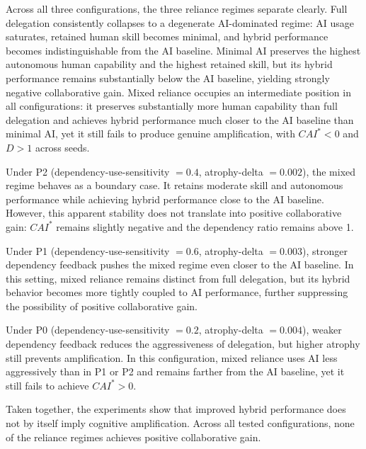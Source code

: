 \documentclass[11pt,a4paper]{article}
\begin{document}
Across all three configurations, the three reliance regimes separate clearly. Full delegation consistently collapses to a degenerate AI-dominated regime: AI usage saturates, retained human skill becomes minimal, and hybrid performance becomes indistinguishable from the AI baseline. Minimal AI preserves the highest autonomous human capability and the highest retained skill, but its hybrid performance remains substantially below the AI baseline, yielding strongly negative collaborative gain. Mixed reliance occupies an intermediate position in all configurations: it preserves substantially more human capability than full delegation and achieves hybrid performance much closer to the AI baseline than minimal AI, yet it still fails to produce genuine amplification, with $CAI^*<0$ and $D>1$ across seeds.

Under P2 (dependency-use-sensitivity $=0.4$, atrophy-delta $=0.002$), the mixed regime behaves as a boundary case. It retains moderate skill and autonomous performance while achieving hybrid performance close to the AI baseline. However, this apparent stability does not translate into positive collaborative gain: $CAI^*$ remains slightly negative and the dependency ratio remains above 1.

Under P1 (dependency-use-sensitivity $=0.6$, atrophy-delta $=0.003$), stronger dependency feedback pushes the mixed regime even closer to the AI baseline. In this setting, mixed reliance remains distinct from full delegation, but its hybrid behavior becomes more tightly coupled to AI performance, further suppressing the possibility of positive collaborative gain.

Under P0 (dependency-use-sensitivity $=0.2$, atrophy-delta $=0.004$), weaker dependency feedback reduces the aggressiveness of delegation, but higher atrophy still prevents amplification. In this configuration, mixed reliance uses AI less aggressively than in P1 or P2 and remains farther from the AI baseline, yet it still fails to achieve $CAI^*>0$.

Taken together, the experiments show that improved hybrid performance does not by itself imply cognitive amplification. Across all tested configurations, none of the reliance regimes achieves positive collaborative gain.
\end{document}
